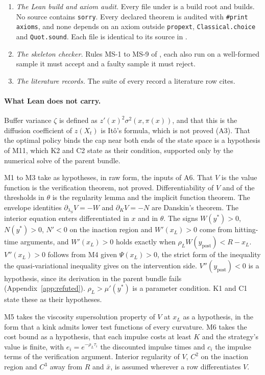 \begin{enumerate}
\item \emph{The Lean build and axiom audit.} Every file under
 is a build root and builds. No source contains
\texttt{sorry}. Every declared theorem is audited with \texttt{\#print axioms},
and none depends on an axiom outside \texttt{propext},
\texttt{Classical.choice} and \texttt{Quot.sound}. Each file is identical to
its source in .
\item \emph{The skeleton checker.} Rules MS-1 to MS-9 of
, each also run on a well-formed
sample it must accept and a faulty sample it must reject.
\item \emph{The literature records.} The suite of every record a literature
row cites.
\end{enumerate}

\paragraph{What Lean does not carry.} Buffer variance $\zeta$ is defined as
$z'(x)^2\sigma^2(x,\pi(x))$, and that this is the diffusion coefficient of
$z(X_t)$ is Itô's formula, which is not proved (A3). That the optimal policy
binds the cap near both ends of the state space is a hypothesis of M11, which
K2 and C2 state as their condition, supported only by the numerical solve of
the parent bundle.

M1 to M3 take as hypotheses, in raw form, the inputs of A6. That $V$ is the
value function is the verification theorem, not proved. Differentiability of
$V$ and of the thresholds in $\theta$ is the regularity lemma and the implicit
function theorem. The envelope identities $\partial_{\lambda_S}V=-W$ and
$\partial_KV=-N$ are Danskin's theorem. The interior equation enters
differentiated in $x$ and in $\theta$. The signs $W(y^*)>0$, $N(y^*)>0$,
$N'<0$ on the inaction region and $W'(x_L)>0$ come from hitting-time
arguments, and $W'(x_L)>0$ holds exactly when $\rho_LW(y_{\text{post}})<R-x_L$.
$V''(x_L)>0$ follows from M4 given $\Psi(x_L)>0$, the strict form of the
inequality the quasi-variational inequality gives on the intervention side.
$V''(y_{\text{post}})<0$ is a hypothesis, since its derivation in the parent
bundle fails (Appendix~\ref{app:refuted}). $\rho_L>\mu'(y^*)$ is a parameter
condition. K1 and C1 state these as their hypotheses.

M5 takes the viscosity supersolution property of $V$ at $x_L$ as a
hypothesis, in the form that a kink admits lower test functions of every
curvature. M6 takes the cost bound as a hypothesis, that each impulse costs at
least $K$ and the strategy's value is finite, with $e_i=e^{-\rho_L\tau_i}$ the
discounted impulse times and $c_i$ the impulse terms of the verification
argument. Interior regularity of $V$, $C^2$ on the inaction region and $C^3$
away from $R$ and $\bar x$, is assumed wherever a row differentiates $V$.

